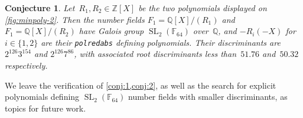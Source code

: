\documentclass[12pt,oneside]{amsart}
\numberwithin{equation}{section}
\newtheorem{conj}[equation]{Conjecture}
\theoremstyle{definition}
\newcommand{\Z}{\mathbb{Z}}
\newcommand{\Q}{\mathbb{Q}}
\newcommand{\F}{\mathbb{F}}
\DeclareMathOperator{\SL}{SL}
\begin{document}
\begin{conj}
  \label{conj:2}
  Let~$R_1,R_2\in \Z[X]$ be the two polynomials displayed on
  \cref{fig:minpoly-2}.  Then the number fields $F_1 = \Q[X]/(R_1)$ and
  $F_1 = \Q[X]/(R_2)$ have Galois group $\SL_2(\F_{64})$ over~$\Q$, and
  $-R_i(-X)$ for $i\in \{1,2\}$ are their \textup{\texttt{polredabs}} defining
  polynomials. Their discriminants are $2^{126}3^{154}$ and $2^{126}7^{86}$,
  with associated root discriminants less than~$51.76$ and~$50.32$
  respectively.
\end{conj}

We leave the verification of \cref{conj:1,conj:2}, as well as the search for
explicit polynomials defining $\SL_2(\F_{64})$ number fields with smaller
discriminants, as topics for future work.

\clearpage

\printbibliography
\end{document}

